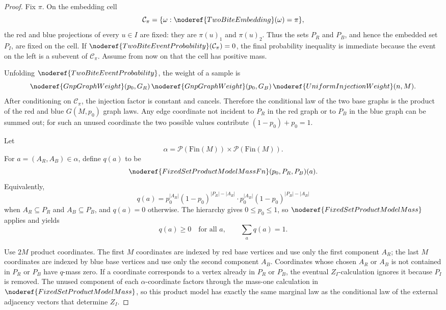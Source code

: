 \begin{proof}
Fix \(\pi\).  On the embedding cell
\[
\mathcal C_\pi=\{\omega:\noderef{TwoBiteEmbedding}(\omega)=\pi\},
\]
the red and blue projections of every \(u\in I\) are fixed: they are
\(\pi(u)_1\) and \(\pi(u)_2\).  Thus the sets \(P_R\) and \(P_B\), and hence
the embedded set \(P_I\), are fixed on the cell.  If
\(\noderef{TwoBiteEventProbability}(\mathcal C_\pi)=0\), the final probability
inequality is immediate because the event on the left is a subevent of
\(\mathcal C_\pi\).  Assume from now on that the cell has positive mass.

Unfolding \(\noderef{TwoBiteEventProbability}\), the weight of a sample is
\[
\noderef{GnpGraphWeight}(p_0,G_R)\,
\noderef{GnpGraphWeight}(p_0,G_B)\,
\noderef{UniformInjectionWeight}(n,M).
\]
After conditioning on \(\mathcal C_\pi\), the injection factor is constant and
cancels.  Therefore the conditional law of the two base graphs is the product
of the red and blue \(G(M,p_0)\) graph laws.  Any edge coordinate not incident
to \(P_R\) in the red graph or to \(P_B\) in the blue graph can be summed out;
for such an unused coordinate the two possible values contribute
\((1-p_0)+p_0=1\).

Let
\[
\alpha=\mathcal P(\mathrm{Fin}(M))\times\mathcal P(\mathrm{Fin}(M)).
\]
For \(a=(A_R,A_B)\in\alpha\), define \(q(a)\) to be
\[
\noderef{FixedSetProductModelMassFn}(p_0,P_R,P_B)(a).
\]
Equivalently,
\[
q(a)=p_0^{|A_R|}(1-p_0)^{|P_R|-|A_R|}
     \cdot p_0^{|A_B|}(1-p_0)^{|P_B|-|A_B|}
\]
when \(A_R\subseteq P_R\) and \(A_B\subseteq P_B\), and \(q(a)=0\)
otherwise.  The hierarchy gives \(0\le p_0\le1\), so
\(\noderef{FixedSetProductModelMass}\) applies and yields
\[
q(a)\ge0\quad\text{for all }a,\qquad \sum_aq(a)=1.
\]

Use \(2M\) product coordinates.  The first \(M\) coordinates are indexed by
red base vertices and use only the first component \(A_R\); the last \(M\)
coordinates are indexed by blue base vertices and use only the second
component \(A_B\).  Coordinates whose chosen \(A_R\) or \(A_B\) is not
contained in \(P_R\) or \(P_B\) have \(q\)-mass zero.  If a coordinate
corresponds to a vertex already in \(P_R\) or \(P_B\), the eventual
\(Z_I\)-calculation ignores it because \(P_I\) is removed.  The unused
component of each \(\alpha\)-coordinate factors through the mass-one
calculation in \(\noderef{FixedSetProductModelMass}\), so this product model
has exactly the same marginal law as the conditional law of the external
adjacency vectors that determine \(Z_I\).


\end{proof}
